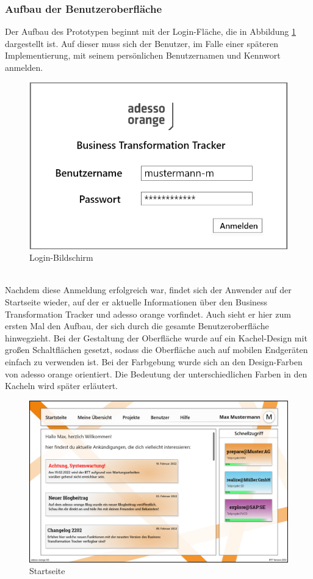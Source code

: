 \subsubsection{Aufbau der Benutzeroberfläche}
Der Aufbau des Prototypen beginnt mit der Login-Fläche, die in Abbildung \ref{fig:Login} dargestellt ist. Auf dieser muss sich der Benutzer, im Falle einer späteren Implementierung, mit seinem persönlichen Benutzernamen und Kennwort anmelden.
\begin{figure}[h!]
    \centering
    \includegraphics[scale=0.4]{./Prototyp/01_Login.png}
    \caption[Prototyp: Login-Bildschirm]{Login-Bildschirm}
    \label{fig:Login}
\end{figure}
\\Nachdem diese Anmeldung erfolgreich war, findet sich der Anwender auf der Startseite wieder, auf der er aktuelle Informationen über den Business Transformation Tracker und adesso orange vorfindet.
Auch sieht er hier zum ersten Mal den Aufbau, der sich durch die gesamte Benutzeroberfläche hinwegzieht. Bei der Gestaltung der Oberfläche wurde auf ein \glqq{}Kachel-Design\grqq{} mit großen Schaltflächen gesetzt, sodass die Oberfläche auch auf mobilen Endgeräten einfach zu verwenden ist. Bei der Farbgebung wurde sich an den Design-Farben von adesso orange orientiert. Die Bedeutung der unterschiedlichen Farben in den Kacheln wird später erläutert. 
\begin{figure}[h!]
    \centering
    \includegraphics[scale=0.4]{./Prototyp/02_Startseite.png}
    \caption[Prototyp: Startseite]{Startseite}
    \label{fig:Startseite}
\end{figure}
